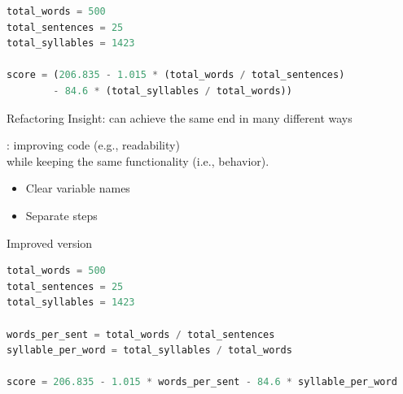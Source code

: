 \documentclass[aspectratio=169,usenames,dvipsnames]{beamer}
\begin{document}
\begin{frame}[fragile]
\begin{lstlisting}[language=python]
total_words = 500
total_sentences = 25
total_syllables = 1423

score = (206.835 - 1.015 * (total_words / total_sentences)
		- 84.6 * (total_syllables / total_words))
\end{lstlisting}
\end{frame}

\begin{frame}{Refactoring}
	Insight: can achieve the same end in many different ways

	\pause
	\begin{definition}
		: improving code (e.g., readability) \\
			while keeping the same functionality (i.e., behavior).
	\end{definition}

	\begin{itemize}
		\item Clear variable names
		\item Separate steps
	\end{itemize}
\end{frame}


\begin{frame}[fragile]{Improved version}
\begin{lstlisting}[language=python]
total_words = 500
total_sentences = 25
total_syllables = 1423

words_per_sent = total_words / total_sentences
syllable_per_word = total_syllables / total_words

score = 206.835 - 1.015 * words_per_sent - 84.6 * syllable_per_word
\end{lstlisting}
\end{frame}
\end{document}
